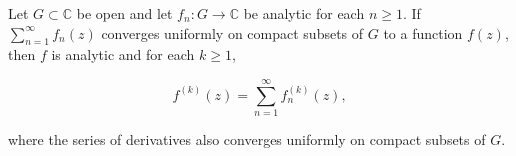 Let $G \subset \mathbb{C}$ be open and let $f_n: G \to \mathbb{C}$ be analytic for each $n \geq 1$. If $\sum_{n=1}^{\infty} f_n(z)$ converges uniformly on compact subsets of $G$ to a function $f(z)$, then $f$ is analytic and for each $k \geq 1$,

$$f^{(k)}(z) = \sum_{n=1}^{\infty} f_n^{(k)}(z),$$

where the series of derivatives also converges uniformly on compact subsets of $G$.
